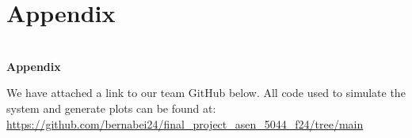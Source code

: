 \documentclass[paper=a4, fontsize=11pt]{scrartcl} %
\numberwithin{equation}{section} %
\numberwithin{figure}{section} %
\numberwithin{table}{section} %
\begin{document}
\newpage
\section{Appendix}
\textbf{\\ Appendix}
\begin{framed}

We have attached a link to our team GitHub below. All code used to simulate the system and generate plots can be found at:
\\
\url{https://github.com/bernabei24/final_project_asen_5044_f24/tree/main}

\end{framed}


   
\end{document}
